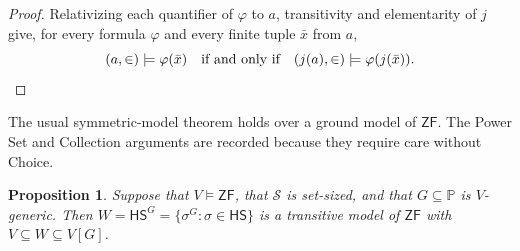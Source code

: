 \documentclass[11pt,a4paper]{amsart}
\newcommand{\ZF}{\mathsf{ZF}}
\newcommand{\HS}{\mathsf{HS}}
\theoremstyle{plain}
\newtheorem{proposition}[theorem]{Proposition}
\theoremstyle{definition}
\theoremstyle{remark}
\begin{document}
\begin{proof}
Relativizing each quantifier of $\varphi$ to $a$, transitivity and elementarity of $j$ give, for every formula $\varphi$ and every finite tuple $\bar x$ from $a$,
\[
(a,\in)\models\varphi(\bar x)
\quad\text{if and only if}\quad
(j(a),\in)\models\varphi(j(\bar x)).\qedhere
\]
\end{proof}

The usual symmetric-model theorem holds over a ground model of $\ZF$.  The Power Set and Collection arguments are recorded because they require care without Choice.

\begin{proposition}\label{prop:symmetric-ZF}
Suppose that $V\models\ZF$, that $\mathscr S$ is set-sized, and that $G\subseteq\mathbb P$ is $V$-generic.  Then
$W=\HS^G=\{\sigma^G:\sigma\in\HS\}$ is a transitive model of $\ZF$ with $V\subseteq W\subseteq V[G]$.
\end{proposition}
\end{document}
